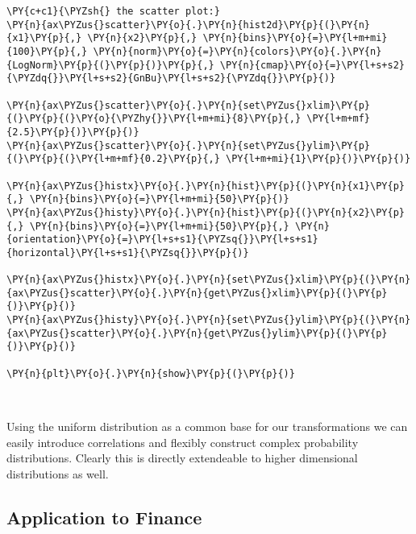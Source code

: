 \begin{tcolorbox}[breakable, size=fbox, boxrule=1pt, pad at break*=1mm,colback=cellbackground, colframe=cellborder]
\begin{Verbatim}[commandchars=\\\{\}]
\PY{c+c1}{\PYZsh{} the scatter plot:}
\PY{n}{ax\PYZus{}scatter}\PY{o}{.}\PY{n}{hist2d}\PY{p}{(}\PY{n}{x1}\PY{p}{,} \PY{n}{x2}\PY{p}{,} \PY{n}{bins}\PY{o}{=}\PY{l+m+mi}{100}\PY{p}{,} \PY{n}{norm}\PY{o}{=}\PY{n}{colors}\PY{o}{.}\PY{n}{LogNorm}\PY{p}{(}\PY{p}{)}\PY{p}{,} \PY{n}{cmap}\PY{o}{=}\PY{l+s+s2}{\PYZdq{}}\PY{l+s+s2}{GnBu}\PY{l+s+s2}{\PYZdq{}}\PY{p}{)}

\PY{n}{ax\PYZus{}scatter}\PY{o}{.}\PY{n}{set\PYZus{}xlim}\PY{p}{(}\PY{p}{(}\PY{o}{\PYZhy{}}\PY{l+m+mi}{8}\PY{p}{,} \PY{l+m+mf}{2.5}\PY{p}{)}\PY{p}{)}
\PY{n}{ax\PYZus{}scatter}\PY{o}{.}\PY{n}{set\PYZus{}ylim}\PY{p}{(}\PY{p}{(}\PY{l+m+mf}{0.2}\PY{p}{,} \PY{l+m+mi}{1}\PY{p}{)}\PY{p}{)}

\PY{n}{ax\PYZus{}histx}\PY{o}{.}\PY{n}{hist}\PY{p}{(}\PY{n}{x1}\PY{p}{,} \PY{n}{bins}\PY{o}{=}\PY{l+m+mi}{50}\PY{p}{)}
\PY{n}{ax\PYZus{}histy}\PY{o}{.}\PY{n}{hist}\PY{p}{(}\PY{n}{x2}\PY{p}{,} \PY{n}{bins}\PY{o}{=}\PY{l+m+mi}{50}\PY{p}{,} \PY{n}{orientation}\PY{o}{=}\PY{l+s+s1}{\PYZsq{}}\PY{l+s+s1}{horizontal}\PY{l+s+s1}{\PYZsq{}}\PY{p}{)}

\PY{n}{ax\PYZus{}histx}\PY{o}{.}\PY{n}{set\PYZus{}xlim}\PY{p}{(}\PY{n}{ax\PYZus{}scatter}\PY{o}{.}\PY{n}{get\PYZus{}xlim}\PY{p}{(}\PY{p}{)}\PY{p}{)}
\PY{n}{ax\PYZus{}histy}\PY{o}{.}\PY{n}{set\PYZus{}ylim}\PY{p}{(}\PY{n}{ax\PYZus{}scatter}\PY{o}{.}\PY{n}{get\PYZus{}ylim}\PY{p}{(}\PY{p}{)}\PY{p}{)}

\PY{n}{plt}\PY{o}{.}\PY{n}{show}\PY{p}{(}\PY{p}{)}
\end{Verbatim}
\end{tcolorbox}

    \begin{center}
    \end{center}
    { \hspace*{\fill} \\}
    
    Using the uniform distribution as a common base for our transformations
we can easily introduce correlations and flexibly construct complex
probability distributions. Clearly this is directly extendeable to
higher dimensional distributions as well.

    \hypertarget{application-to-finance}{%
\subsection{Application to Finance}\label{application-to-finance}}

